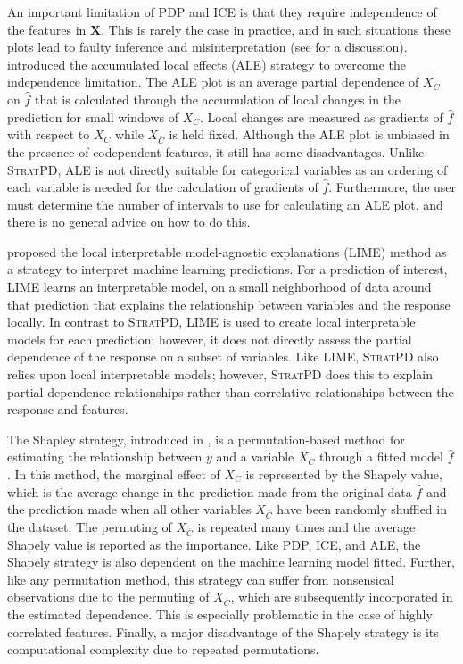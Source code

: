 \documentclass[12pt]{article}
\newcommand{\spd}{\fontfamily{cmr}\textsc{\small StratPD}}
\begin{document}
An important limitation of PDP and ICE is that they require independence of the features in $\mathbf{X}$. This is rarely the case in practice, and in such situations these plots lead to faulty inference and misinterpretation (see \cite{apley2016visualizing} for a discussion). \cite{apley2016visualizing} introduced the accumulated local effects (ALE) strategy to overcome the independence limitation. The ALE plot is an average partial dependence of $X_C$ on $\widehat{f}$ that is calculated through the accumulation of local changes in the prediction for small windows of $X_C$. Local changes are measured as gradients of $\widehat{f}$ with respect to $X_C$ while $X_{\overline{C}}$ is held fixed. Although the ALE plot is unbiased in the presence of codependent features, it still has some disadvantages. Unlike \spd{}, ALE is not directly suitable for categorical variables as an ordering of each variable is needed for the calculation of gradients of $\widehat{f}$. Furthermore, the user must determine the number of intervals to use for calculating an ALE plot, and there is no general advice on how to do this.

\cite{ribeiro2016should} proposed the local interpretable model-agnostic explanations (LIME) method as a strategy to interpret machine learning predictions. For a prediction of interest, LIME learns an interpretable model, on a small neighborhood of data around that prediction that explains the relationship between variables and the response locally. In contrast to \spd{}, LIME is used to create local interpretable models for each prediction; however, it does not directly assess the partial dependence of the response on a subset of variables. Like LIME, \spd{} also relies upon local interpretable models; however, \spd{} does this to explain partial dependence relationships rather than correlative relationships between the response and features. 

The Shapley strategy, introduced in \cite{lundberg2016unexpected}, is a permutation-based method for estimating the relationship between ${y}$ and a variable $X_C$ through a fitted model $\widehat{f}$. In this method, the marginal effect of $X_C$ is represented by the Shapely value, which is the average change in the prediction made from the original data $\widehat{f}$ and the prediction made when all other variables $X_{\overline{C}}$ have been randomly shuffled in the dataset. The permuting of $X_{\overline{C}}$ is repeated many times and the average Shapely value is reported as the importance. Like PDP, ICE, and ALE, the Shapely strategy is also dependent on the machine learning model fitted. Further, like any permutation method, this strategy can suffer from nonsensical observations due to the permuting of $X_{\overline{C}}$, which are subsequently incorporated in the estimated dependence. This is especially problematic in the case of highly correlated features. Finally, a major disadvantage of the Shapely strategy is its computational complexity due to repeated permutations. 
\end{document}
